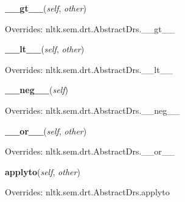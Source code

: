 \hspace{.8\funcindent}\begin{boxedminipage}{\funcwidth}

    \raggedright \textbf{\_\_gt\_\_}(\textit{self}, \textit{other})

\setlength{\parskip}{2ex}
\setlength{\parskip}{1ex}
      Overrides: nltk.sem.drt.AbstractDrs.\_\_gt\_\_

    \end{boxedminipage}

    \vspace{0.5ex}

\hspace{.8\funcindent}\begin{boxedminipage}{\funcwidth}

    \raggedright \textbf{\_\_lt\_\_}(\textit{self}, \textit{other})

\setlength{\parskip}{2ex}
\setlength{\parskip}{1ex}
      Overrides: nltk.sem.drt.AbstractDrs.\_\_lt\_\_

    \end{boxedminipage}

    \vspace{0.5ex}

\hspace{.8\funcindent}\begin{boxedminipage}{\funcwidth}

    \raggedright \textbf{\_\_neg\_\_}(\textit{self})

\setlength{\parskip}{2ex}
\setlength{\parskip}{1ex}
      Overrides: nltk.sem.drt.AbstractDrs.\_\_neg\_\_

    \end{boxedminipage}

    \vspace{0.5ex}

\hspace{.8\funcindent}\begin{boxedminipage}{\funcwidth}

    \raggedright \textbf{\_\_or\_\_}(\textit{self}, \textit{other})

\setlength{\parskip}{2ex}
\setlength{\parskip}{1ex}
      Overrides: nltk.sem.drt.AbstractDrs.\_\_or\_\_

    \end{boxedminipage}

    \vspace{0.5ex}

\hspace{.8\funcindent}\begin{boxedminipage}{\funcwidth}

    \raggedright \textbf{applyto}(\textit{self}, \textit{other})

\setlength{\parskip}{2ex}
\setlength{\parskip}{1ex}
      Overrides: nltk.sem.drt.AbstractDrs.applyto

    \end{boxedminipage}

